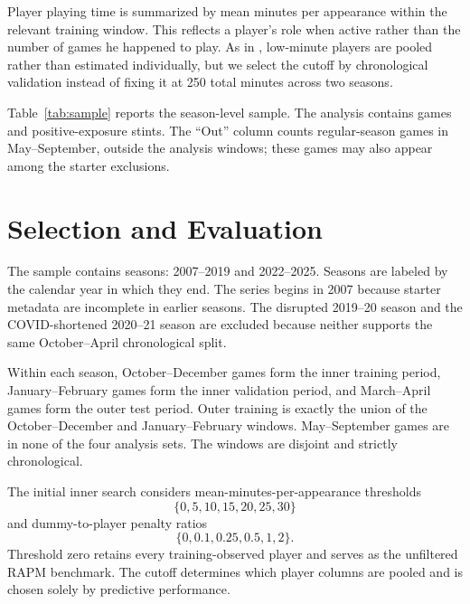 \documentclass[12pt]{article}
\begin{document}
Player playing time is summarized by mean minutes per appearance within the
relevant training window. This reflects a player's role when active rather
than the number of games he happened to play. As in \citet{Rosenbaum2004},
low-minute players are pooled rather than estimated individually, but we
select the cutoff by chronological validation instead of fixing it at 250
total minutes across two seasons.

Table~\ref{tab:sample} reports the season-level sample. The analysis contains
\TotalModeledGames{} games and \TotalModeledStints{} positive-exposure stints.
The ``Out'' column counts regular-season games in May--September, outside the
analysis windows; these games may also appear among the starter exclusions.

\begin{table}[htbp]
\centering
\caption{Season-level analysis sample and chronological windows}
\label{tab:sample}

\end{table}

\section{Selection and Evaluation}

The sample contains \NumberSeasons{} seasons: 2007--2019 and 2022--2025.
Seasons are labeled by the calendar year in which they end. The series begins
in 2007 because starter metadata are incomplete in earlier seasons. The
disrupted 2019--20 season and the COVID-shortened 2020--21 season are excluded
because neither supports the same October--April chronological split.

Within each season, October--December games form the inner training period,
January--February games form the inner validation period, and March--April
games form the outer test period. Outer training is exactly the union of the
October--December and January--February windows. May--September games are in
none of the four analysis sets. The windows are disjoint and strictly
chronological.

The initial inner search considers mean-minutes-per-appearance thresholds
\[
\{0,5,10,15,20,25,30\}
\]
and dummy-to-player penalty ratios
\[
\{0,0.1,0.25,0.5,1,2\}.
\]
Threshold zero retains every training-observed player and serves as the
unfiltered RAPM benchmark. The cutoff determines which player columns are
pooled and is chosen solely by predictive performance.
\end{document}
